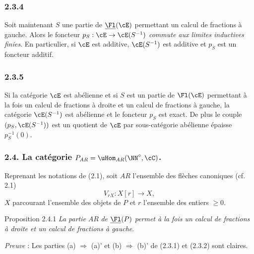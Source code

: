 \subsubsection*{2.3.4}
Soit maintenant $S$ une partie de $\underline{\Fl}(\cE)$ permettant un calcul de fractions à gauche. Alors le foncteur $p_S:\cE\to\cE(S^{-1})$ \emph{commute aux limites inductives finies}. En particulier, si $\cE$ est additive, $\cE(S^{-1})$ est additive et $p_S$ est un foncteur additif.

\subsubsection*{2.3.5}
Si la
catégorie $\cE$ est abélienne et si $S$ est un partie de $\Fl(\cE)$ permettant à la fois un calcul de fractions à droite et un calcul de fractions à gauche, la catégorie $\cE(S^{-1})$ est abélienne et le foncteur $p_S$ est exact. De plus le couple $(p_S,\cE(S^{-1}))$ est un quotient de $\cE$ par sous-catégorie abélienne épaisse $p_S^{-1}(0)$.

\subsubsection*{2.4. La catégorie $P_{AR}=\uHom_{AR}(\NN^\circ,\cC)$.}
Reprenant les notations de (2.1), soit $AR$ l'ensemble des flèches canoniques (cf. 2.1)
\[
V_{rX}:X[r]\longrightarrow X,
\]
$X$ parcourant l'ensemble des objets de $P$ et $r$ l'ensemble des entiers $\ge0$.

\begin{statement}{Proposition 2.4.1}
\emph{La partie} $AR$ \emph{de} $\underline{\Fl}(P)$ \emph{permet à la fois un calcul de fractions à droite et un calcul de fractions à gauche}.
\end{statement}

\emph{Preuve} : Les parties (a) $\Rightarrow$ (a)' et (b) $\Rightarrow$ (b)' de (2.3.1) et (2.3.2) sont claires.

